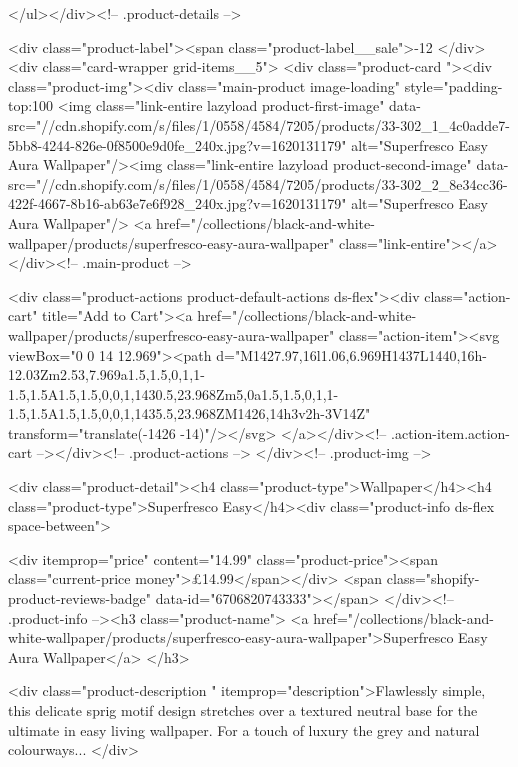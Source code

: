 {{{{{{{      </ul></div><!-- .product-details -->

<div class="product-label"><span class="product-label__sale">-12%
          </div><div class="card-wrapper grid-items__5">
            <div class="product-card "><div class="product-img"><div class="main-product image-loading" style="padding-top:100%
      <img class="link-entire lazyload product-first-image" data-src="//cdn.shopify.com/s/files/1/0558/4584/7205/products/33-302_1_4c0adde7-5bb8-4244-826e-0f8500e9d0fe_240x.jpg?v=1620131179" alt="Superfresco Easy Aura Wallpaper"/><img class="link-entire lazyload product-second-image" data-src="//cdn.shopify.com/s/files/1/0558/4584/7205/products/33-302_2_8e34cc36-422f-4667-8b16-ab63e7e6f928_240x.jpg?v=1620131179" alt="Superfresco Easy Aura Wallpaper"/>
      <a href="/collections/black-and-white-wallpaper/products/superfresco-easy-aura-wallpaper" class="link-entire"></a>
    </div><!-- .main-product -->
  
<div class="product-actions product-default-actions ds-flex"><div class="action-cart" title="Add to Cart"><a href="/collections/black-and-white-wallpaper/products/superfresco-easy-aura-wallpaper" class="action-item"><svg viewBox="0 0 14 12.969"><path d="M1427.97,16l1.06,6.969H1437L1440,16h-12.03Zm2.53,7.969a1.5,1.5,0,1,1-1.5,1.5A1.5,1.5,0,0,1,1430.5,23.968Zm5,0a1.5,1.5,0,1,1-1.5,1.5A1.5,1.5,0,0,1,1435.5,23.968ZM1426,14h3v2h-3V14Z" transform="translate(-1426 -14)"/></svg>
</a></div><!-- .action-item.action-cart --></div><!-- .product-actions -->
</div><!-- .product-img -->

<div class="product-detail"><h4 class="product-type">Wallpaper</h4><h4 class="product-type">Superfresco Easy</h4><div class="product-info ds-flex space-between">
    
<div itemprop="price" content="14.99" class="product-price"><span class="current-price money">£14.99</span></div>
    <span class="shopify-product-reviews-badge" data-id="6706820743333"></span>
  </div><!-- .product-info --><h3 class="product-name">
      <a href="/collections/black-and-white-wallpaper/products/superfresco-easy-aura-wallpaper">Superfresco Easy Aura Wallpaper</a>
    </h3>
    
<div class="product-description " itemprop="description">Flawlessly simple, this delicate sprig motif design stretches over a textured neutral base for the ultimate in easy living wallpaper. For a touch of luxury the grey and natural colourways...
</div>



}}}}}}}
